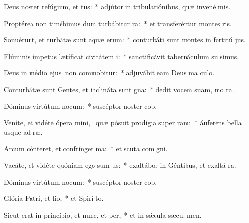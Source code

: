 \item Deus noster refúgium, et tus:~* adjútor in tribulatiónibus, quæ invené  mis.
\item Proptérea non timébimus dum turbábitur ra:~* et transferéntur montes   ris.
\item Sonuérunt, et turbátæ sunt aquæ erum:~* conturbáti sunt montes in fortitú jus.
\item Flúminis ímpetus lætíficat civitátem i:~* sanctificávit tabernáculum su simus.
\item Deus in médio ejus, non commobitur:~* adjuvábit eam Deus ma culo.
\item Conturbátæ sunt Gentes, et inclináta sunt gna:~* dedit vocem suam, mo  ra.
\item Dóminus virtútum nocum:~* suscéptor noster  cob.
\item Veníte, et vidéte ópera mini,~\pscross{} quæ pósuit prodígia super ram:~* áuferens bella usque ad  ræ.
\item Arcum cónteret, et confrínget ma:~* et scuta com gni.
\item Vacáte, et vidéte quóniam ego sum us:~* exaltábor in Géntibus, et exaltá  ra.
\item Dóminus virtútum nocum:~* suscéptor noster  cob.
\item Glória Patri, et lio,~* et Spirí to.
\item Sicut erat in princípio, et nunc, et per,~* et in sǽcula sæcu. men.

